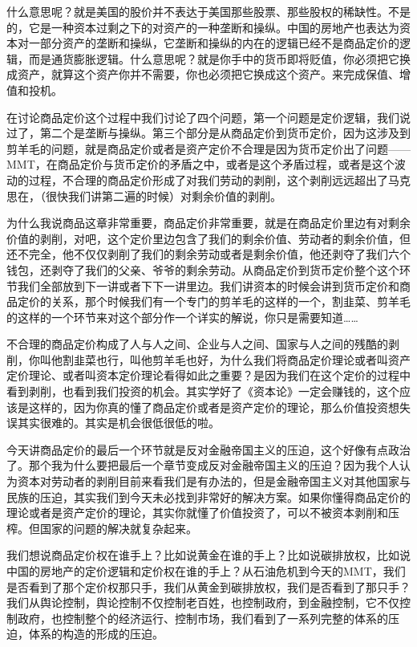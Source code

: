 \documentclass[UTF8, 12pt, a4paper]{ctexrep}
\begin{document}
什么意思呢？就是美国的股价并不表达于美国那些股票、那些股权的稀缺性。不是的，它是一种资本过剩之下的对资产的一种垄断和操纵。中国的房地产也表达为资本对一部分资产的垄断和操纵，它垄断和操纵的内在的逻辑已经不是商品定价的逻辑，而是通货膨胀逻辑。什么意思呢？就是你手中的货币即将贬值，你必须把它换成资产，就算这个资产你并不需要，你也必须把它换成这个资产。来完成保值、增值和投机。

在讨论商品定价这个过程中我们讨论了四个问题，第一个问题是定价逻辑，我们说过了，第二个是垄断与操纵。第三个部分是从商品定价到货币定价，因为这涉及到剪羊毛的问题，就是商品定价或者是资产定价不合理是因为货币定价出了问题——MMT，在商品定价与货币定价的矛盾之中，或者是这个矛盾过程，或者是这个波动的过程，不合理的商品定价形成了对我们劳动的剥削，这个剥削远远超出了马克思在，（很快我们讲第二遍的时候）对剩余价值的剥削。

为什么我说商品这章非常重要，商品定价非常重要，就是在商品定价里边有对剩余价值的剥削，对吧，这个定价里边包含了我们的剩余价值、劳动者的剩余价值，但还不完全，他不仅仅剥削了我们的剩余劳动或者是剩余价值，他还剥夺了我们六个钱包，还剥夺了我们的父亲、爷爷的剩余劳动。从商品定价到货币定价整个这个环节我们全部放到下一讲或者下下一讲里边。我们讲资本的时候会讲到货币定价和商品定价的关系，那个时候我们有一个专门的剪羊毛的这样的一个，割韭菜、剪羊毛的这样的一个环节来对这个部分作一个详实的解说，你只是需要知道……

不合理的商品定价构成了人与人之间、企业与人之间、国家与人之间的残酷的剥削，你叫他割韭菜也行，叫他剪羊毛也好，为什么我们将商品定价理论或者叫资产定价理论、或者叫资本定价理论看得如此之重要？是因为我们在这个定价的过程中看到剥削，也看到我们投资的机会。其实学好了《资本论》一定会赚钱的，这个应该是这样的，因为你真的懂了商品定价或者是资产定价的理论，那么价值投资想失误其实很难的。其实是机会很低很低的啦。

今天讲商品定价的最后一个环节就是反对金融帝国主义的压迫，这个好像有点政治了。那个我为什么要把最后一个章节变成反对金融帝国主义的压迫？因为我个人认为资本对劳动者的剥削目前来看我们是有办法的，但是金融帝国主义对其他国家与民族的压迫，其实我们到今天未必找到非常好的解决方案。如果你懂得商品定价的理论或者是资产定价的理论，其实你就懂了价值投资了，可以不被资本剥削和压榨。但国家的问题的解决就复杂起来。

我们想说商品定价权在谁手上？比如说黄金在谁的手上？比如说碳排放权，比如说中国的房地产的定价逻辑和定价权在谁的手上？从石油危机到今天的MMT，我们是否看到了那个定价权那只手，我们从黄金到碳排放权，我们是否看到了那只手？我们从舆论控制，舆论控制不仅控制老百姓，也控制政府，到金融控制，它不仅控制政府，也控制整个的经济运行、控制市场，我们看到了一系列完整的体系的压迫，体系的构造的形成的压迫。
\end{document}

